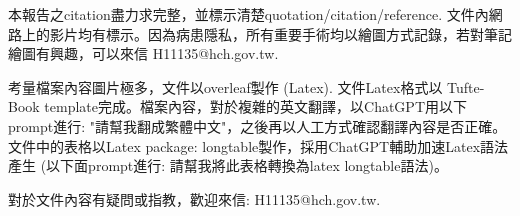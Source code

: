 \documentclass[nols]{tufte-book}
\begin{document}
本報告之citation盡力求完整，並標示清楚quotation/citation/reference. 文件內網路上的影片均有標示。因為病患隱私，所有重要手術均以繪圖方式記錄，若對筆記繪圖有興趣，可以來信 H11135@hch.gov.tw. 

考量檔案內容圖片極多，文件以overleaf製作 (Latex). 文件Latex格式以 Tufte-Book template完成。檔案內容，對於複雜的英文翻譯，以ChatGPT用以下prompt進行: "請幫我翻成繁體中文"，之後再以人工方式確認翻譯內容是否正確。文件中的表格以Latex package: longtable製作，採用ChatGPT輔助加速Latex語法產生 (以下面prompt進行: 請幫我將此表格轉換為latex longtable語法)。

對於文件內容有疑問或指教，歡迎來信: H11135@hch.gov.tw. 



\end{document}
